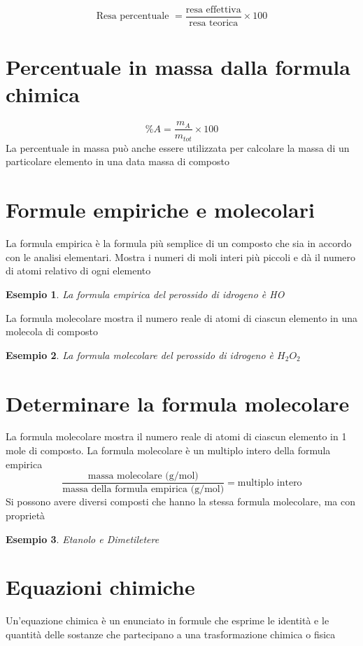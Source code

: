 \documentclass[a4paper,11pt]{report}
\newtheorem*{es}{Esempio}
\begin{document}
\[\text{Resa percentuale } = \frac{\text{resa effettiva}}{\text{resa teorica}} \times 100 \]

\section{Percentuale in massa dalla formula chimica}
\begin{equation*}
	\% A = \frac{m_A}{m_{tot}} \times 100
\end{equation*}
La percentuale in massa può anche essere utilizzata per calcolare la massa di un particolare elemento in una data massa di composto

\section{Formule empiriche e molecolari}
La formula empirica è la formula più semplice di un composto che sia in accordo con le analisi elementari. Mostra i numeri di moli interi più piccoli e dà il numero di atomi relativo di ogni elemento 

\begin{es}
	La formula empirica del perossido di idrogeno è HO
\end{es}

\noindent La formula molecolare mostra il numero reale di atomi di ciascun elemento in una molecola di composto

\begin{es}
	La formula molecolare del perossido di idrogeno è $H_2O_2$
\end{es}

\section{Determinare la formula molecolare}
La formula molecolare mostra il numero reale di atomi di ciascun elemento in 1 mole di composto. La formula molecolare è un multiplo intero della formula empirica
\begin{equation*}
	\frac{\text{massa molecolare (g/mol)}}{\text{massa della formula empirica (g/mol)}} = \text{multiplo intero}
\end{equation*}
Si possono avere diversi composti che hanno la stessa formula molecolare, ma con proprietà
\begin{es}
	Etanolo e Dimetiletere
\end{es}

\section{Equazioni chimiche}
Un'equazione chimica è un enunciato in formule che esprime le identità e le quantità delle sostanze che partecipano a una trasformazione chimica o fisica
\end{document}
